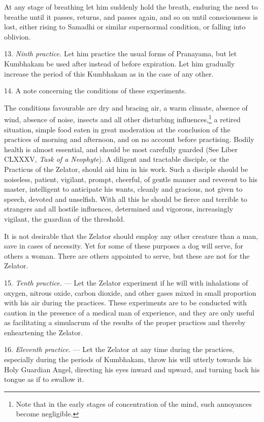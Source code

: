 At any stage of breathing let him suddenly hold the breath, enduring the need to breathe until it passes, returns, and passes again, and so on until consciousness is lost, either rising to Samadhi or similar supernormal condition, or falling into oblivion.

13. \textit{Ninth practice.} Let him practice the usual forms of Pranayama, but let Kumbhakam be used after instead of before expiration. Let him gradually increase the period of this Kumbhakam as in the case of any other.

14. A note concerning the conditions of these experiments.

The conditions favourable are dry and bracing air, a warm climate, absence of wind, absence of noise, insects and all other disturbing influences,\footnote{Note that in the early stages of concentration of the mind, such annoyances become negligible.} a retired situation, simple food eaten in great moderation at the conclusion of the practices of morning and afternoon, and on no account before practising. Bodily health is almost essential, and should be most carefully guarded (See Liber CLXXXV, \textit{Task of a Neophyte}). A diligent and tractable disciple, or the Practicus of the Zelator, should aid him in his work. Such a disciple should be noiseless, patient, vigilant, prompt, cheerful, of gentle manner and reverent to his master, intelligent to anticipate his wants, cleanly and gracious, not given to speech, devoted and unselfish. With all this he should be fierce and terrible to strangers and all hostile influences, determined and vigorous, increasingly vigilant, the guardian of the threshold.

It is not desirable that the Zelator should employ any other creature than a man, save in cases of necessity. Yet for some of these purposes a dog will serve, for others a woman. There are others appointed to serve, but these are not for the Zelator.

15. \textit{Tenth practice.} --- Let the Zelator experiment if he will with inhalations of oxygen, nitrous oxide, carbon dioxide, and other gases mixed in small proportion with his air during the practices. These experiments are to be conducted with caution in the presence of a medical man of experience, and they are only useful as facilitating a simulacrum of the results of the proper practices and thereby enheartening the Zelator.

16. \textit{Eleventh practice.} --- Let the Zelator at any time during the practices, especially during the periods of Kumbhakam, throw his will utterly towards his Holy Guardian Angel, directing his eyes inward and upward, and turning back his tongue as if to swallow it.

